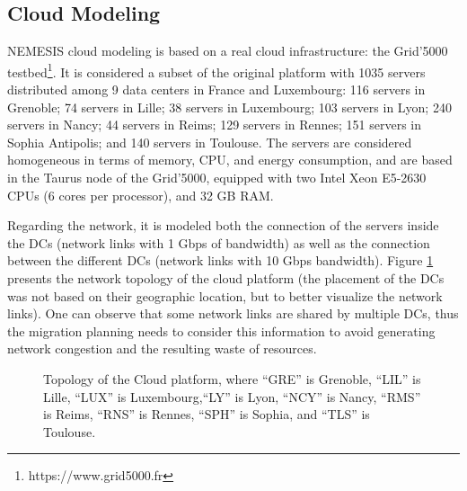 \subsection{Cloud Modeling}\label{sec:cloud_model}

NEMESIS cloud modeling is based on a real cloud infrastructure:
the Grid'5000 testbed\footnote{https://www.grid5000.fr}. It is considered a subset of the original platform with
1035 servers distributed among 9 data centers in France and Luxembourg: 116 servers in Grenoble; 74
servers in Lille; 38 servers in Luxembourg; 103 servers in Lyon; 240
servers in Nancy; 44 servers in Reims;  129 servers in Rennes;  151
servers in Sophia Antipolis; and 140 servers in Toulouse. The servers are
considered homogeneous in terms of memory, CPU, and energy
consumption, and are based in the Taurus node of the Grid'5000, equipped
with two Intel Xeon E5-2630 CPUs (6 cores per processor), and 32 GB
RAM.

Regarding the network, it is modeled both the connection of the servers inside the DCs (network links with 1
Gbps of bandwidth) as well as the connection between the different DCs  (network links with 10 Gbps bandwidth). Figure \ref{fig:topology} presents the
network topology of the cloud platform (the placement of the DCs
was not based on their geographic location, but to better visualize
the network links). One can observe that some network links
are shared by multiple DCs, thus the migration planning needs to
consider this information to avoid generating network congestion and
the resulting waste of resources.

\begin{figure}[ht]
  \centering
   {}
  \caption{Topology of the Cloud platform, where ``GRE'' is Grenoble,  ``LIL'' is Lille, ``LUX'' is Luxembourg,``LY'' is Lyon, ``NCY'' is Nancy, ``RMS'' is Reims,  ``RNS'' is Rennes, ``SPH'' is Sophia, and  ``TLS'' is Toulouse.}
  \label{fig:topology}
 \end{figure}
 


